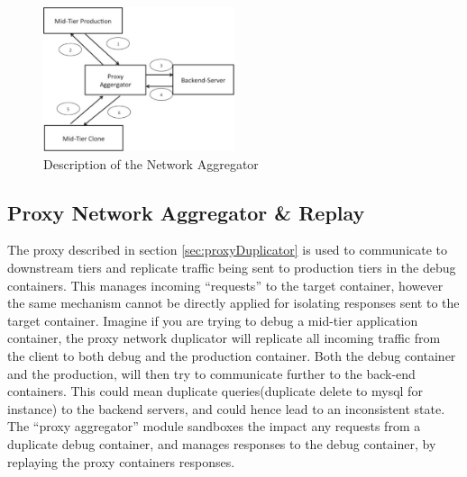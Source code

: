

\begin{figure}[ht!]
  \begin{center}
    \includegraphics[width=0.5\textwidth]{figs/aggregator.eps}
    \caption{Description of the Network Aggregator}
    \label{fig:aggregator}
  \end{center}
\end{figure}

\subsection{Proxy Network Aggregator \& Replay }
\label{sec:proxyAggregator}

The proxy described in section \ref{sec:proxyDuplicator} is used to communicate to downstream tiers and replicate traffic being sent to production tiers in the debug containers.
This manages incoming ``requests'' to the target container, however the same mechanism cannot be directly applied for isolating responses sent to the target container. 
Imagine if you are trying to debug a mid-tier application container, the proxy network duplicator will replicate all incoming traffic from the client to both debug and the production container. 
Both the debug container and the production, will then try to communicate further to the back-end containers.
This could mean duplicate queries(duplicate delete to mysql for instance) to the backend servers, and could hence lead to an inconsistent state.
The ``proxy aggregator'' module sandboxes the impact any requests from a duplicate debug container, and manages responses to the debug container, by replaying the proxy containers responses.

